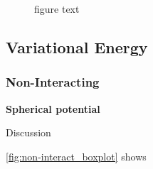 \begin{figure}[H]
\qquad
{}
\caption{figure text}
\label{fig:trace_phase}
\end{figure}


\subsection{Variational Energy}

\subsubsection{Non-Interacting}

\textbf{Spherical potential}

Discussion

\autoref{fig:non-interact_boxplot} shows 

